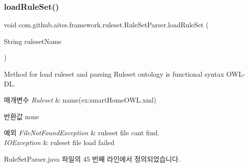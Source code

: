 \subsubsection{\texorpdfstring{load\+Rule\+Set()}{loadRuleSet()}}
{\footnotesize\ttfamily void com.\+github.\+aites.\+framework.\+ruleset.\+Rule\+Set\+Parser.\+load\+Rule\+Set (\begin{DoxyParamCaption}\item[{String}]{ruleset\+Name }\end{DoxyParamCaption})}



Method for load ruleset and parsing Ruleset ontology is functional syntax O\+W\+L-\/\+DL. 


\begin{DoxyParams}{매개변수}
{\em Ruleset} & name(ex\+:smart\+Home\+O\+W\+L.\+xml) \\
\hline
\end{DoxyParams}
\begin{DoxyReturn}{반환값}
none 
\end{DoxyReturn}

\begin{DoxyExceptions}{예외}
{\em File\+Not\+Found\+Exception} & ruleset file can\textquotesingle{}t find. \\
\hline
{\em I\+O\+Exception} & ruleset file load failed \\
\hline
\end{DoxyExceptions}


Rule\+Set\+Parser.\+java 파일의 45 번째 라인에서 정의되었습니다.


